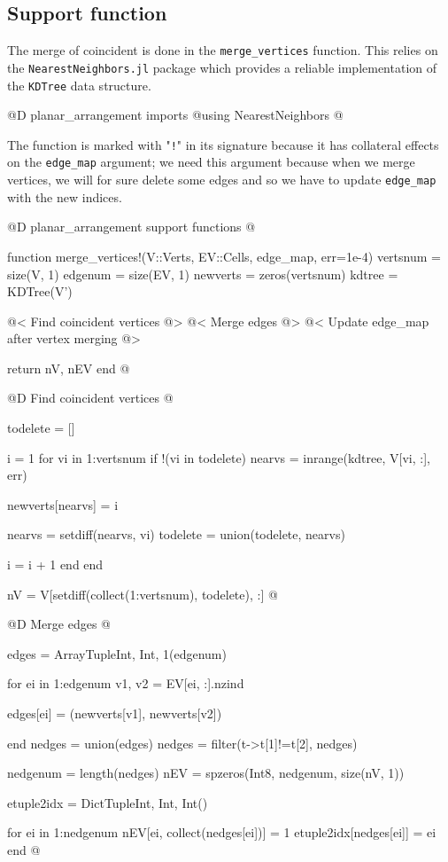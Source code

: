 \subsection{Support function}
The merge of coincident is done in the \texttt{merge\_vertices}
function. This relies on the \texttt{NearestNeighbors.jl} package\cite{NearestNeighbors}
which provides a reliable implementation of the \texttt{KDTree} data structure.

@D planar\_arrangement imports
@{using NearestNeighbors
@}

The function is marked with "\texttt{!}" in its signature 
because it has collateral effects
on the \texttt{edge\_map} argument; we need this argument because when we
merge vertices, we will for sure delete some edges and so we have
to update \texttt{edge\_map} with the new indices.

@D planar\_arrangement support functions
@{function merge_vertices!(V::Verts, EV::Cells, edge_map, err=1e-4)
    vertsnum = size(V, 1)
    edgenum = size(EV, 1)
    newverts = zeros(vertsnum)
    kdtree = KDTree(V')

    @< Find coincident vertices @>
    @< Merge edges @>
    @< Update edge\_map after vertex merging @>

    return nV, nEV
end
@}

@D Find coincident vertices
@{todelete = []

i = 1
for vi in 1:vertsnum
    if !(vi in todelete)
        nearvs = inrange(kdtree, V[vi, :], err)

        newverts[nearvs] = i

        nearvs = setdiff(nearvs, vi)
        todelete = union(todelete, nearvs)

        i = i + 1
    end
end

nV = V[setdiff(collect(1:vertsnum), todelete), :]
@}

@D Merge edges
@{edges = Array{Tuple{Int, Int}, 1}(edgenum)

for ei in 1:edgenum
    v1, v2 = EV[ei, :].nzind
    
    edges[ei] = (newverts[v1], newverts[v2])

end
nedges = union(edges)
nedges = filter(t->t[1]!=t[2], nedges)

nedgenum = length(nedges)
nEV = spzeros(Int8, nedgenum, size(nV, 1))

etuple2idx = Dict{Tuple{Int, Int}, Int}()

for ei in 1:nedgenum
    nEV[ei, collect(nedges[ei])] = 1
    etuple2idx[nedges[ei]] = ei
end
@}

